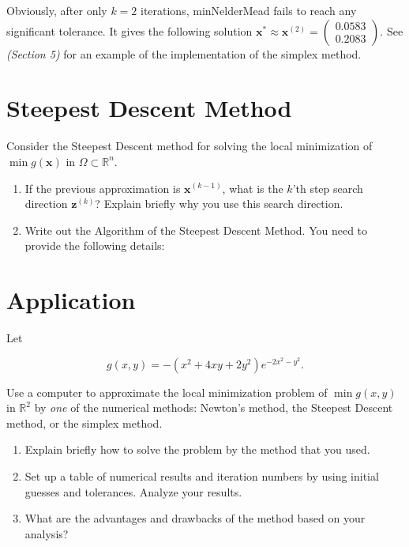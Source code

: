 \documentclass[11pt,oneside]{extarticle}
\newcommand{\Real}{\mathbb{R}}
\newcommand{\vect}[1]{\boldsymbol{#1}}
\begin{document}
\begin{enumerate}
\begin{center}
\begin{tabular}{c |c|c|c|c|c|c|c||c|c|c}
            \end{tabular}
            \end{center}

            Obviously, after only $k=2$ iterations, {\ttfamily minNelderMead}
            fails to reach any significant tolerance. It gives the following solution
        $\vect{x}^* \approx \vect{x}^{(2)} = \begin{pmatrix}0.0583\\ 0.2083\end{pmatrix}$.
            See \emph{(Section 5)} for an example of the implementation of the simplex
            method.

    \end{enumerate}

\section{Steepest Descent Method}

Consider the Steepest Descent method for solving the local minimization of
$\min g(\vect{x})$ in $\Omega\subset\Real^n$.

    \begin{enumerate}

        \item If the previous approximation is $\vect{x}^{(k-1)}$, what is the
            $k$'th step search direction $\vect{z}^{(k)}$? Explain briefly why
            you use this search direction.

        \item Write out the Algorithm of the Steepest Descent Method. You need
            to provide the following details:

    \end{enumerate}

\newpage

\section{Application}

Let

$$g(x,y) = -\left( x^2 + 4xy + 2y^2 \right) e^{ -2x^2 - y^2 }.$$

Use a computer to approximate the local minimization problem of $\min g(x,y)$
in $\Real^2$ by \emph{one} of the numerical methods: Newton's method, the Steepest
Descent method, or the simplex method.

\begin{enumerate}

    \item Explain briefly how to solve the problem by the method that you used.

    \item Set up a table of numerical results and iteration numbers by using
        initial guesses and tolerances. Analyze your results.

    \item What are the advantages and drawbacks of the method based on your
        analysis?

\end{enumerate}
\end{document}
